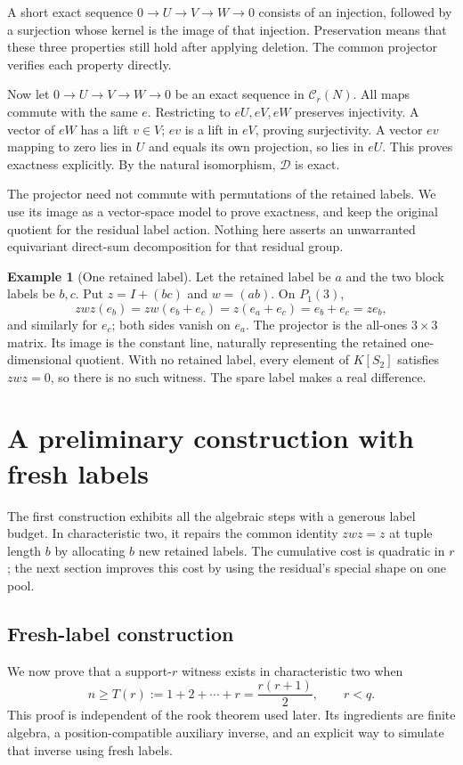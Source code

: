 \documentclass[11pt,a4paper]{article}
\theoremstyle{definition}\newtheorem{definition}[theorem]{Definition}
\newtheorem{example}[theorem]{Example}
\theoremstyle{remark}\newtheorem{remark}[theorem]{Remark}
\newcommand{\D}{\mathcal D}\newcommand{\Del}{\mathcal D}\newcommand{\Lift}{\mathsf L}
\begin{document}
A short exact sequence $0\to U\to V\to W\to0$ consists of an
injection, followed by a surjection whose kernel is the image of that
injection. Preservation means that these three properties still hold
after applying deletion. The common projector verifies each property
directly.

Now let $0\to U\to V\to W\to0$ be an exact sequence in $\mathcal C_r(N)$. All maps commute with the same $e$. Restricting to $eU,eV,eW$ preserves injectivity. A vector of $eW$ has a lift $v\in V$; $ev$ is a lift in $eV$, proving surjectivity. A vector $ev$ mapping to zero lies in $U$ and equals its own projection, so lies in $eU$. This proves exactness explicitly. By the natural isomorphism, $\D$ is exact.

The projector need not commute with permutations of the retained labels. We use its image as a vector-space model to prove exactness, and keep the original quotient for the residual label action. Nothing here asserts an unwarranted equivariant direct-sum decomposition for that residual group.

\begin{example}[One retained label]
Let the retained label be $a$ and the two block labels be $b,c$. Put $z=I+(bc)$ and $w=(ab)$. On $P_1(3)$,
\[zwz(e_b)=zw(e_b+e_c)=z(e_a+e_c)=e_b+e_c=ze_b,\]
and similarly for $e_c$; both sides vanish on $e_a$. The projector is the all-ones $3\times3$ matrix. Its image is the constant line, naturally representing the retained one-dimensional quotient. With no retained label, every element of $K[S_2]$ satisfies $zwz=0$, so there is no such witness. The spare label makes a real difference.
\end{example}

\section{A preliminary construction with fresh labels}\label{sec:quadratic-route}
The first construction exhibits all the algebraic steps with a
generous label budget. In characteristic two, it repairs the common
identity $zwz=z$ at tuple length $b$ by allocating $b$ new retained
labels. The cumulative cost is quadratic in $r$; the next section
improves this cost by using the residual's special shape on one pool.

\subsection{Fresh-label construction}\label{sec:quadratic}
We now prove that a support-$r$ witness exists in characteristic two when
\[n\ge T(r):=1+2+\cdots+r=\frac{r(r+1)}2,\qquad r<q.\]
This proof is independent of the rook theorem used later. Its ingredients are finite algebra, a position-compatible auxiliary inverse, and an explicit way to simulate that inverse using fresh labels.
\end{document}

